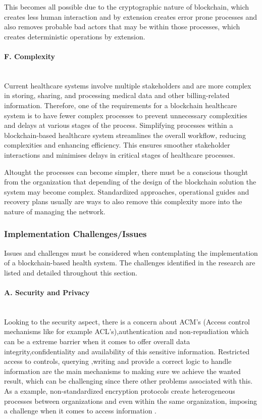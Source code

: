 This becomes all possible due to the cryptographic nature of blockchain, which creates less human interaction and by extension creates error prone processes and also removes probable bad actors that may be within those processes, which creates deterministic operations by extension.
\paragraph{F. Complexity} \mbox{}\\
Current healthcare systems involve multiple stakeholders and are more complex in storing, sharing, and processing medical data and other billing-related information. Therefore, one of the requirements for a blockchain healthcare system is to have fewer complex processes to prevent unnecessary complexities and delays at various stages of the process.
Simplifying processes within a blockchain-based healthcare system streamlines the overall workflow, reducing complexities and enhancing efficiency. This ensures smoother stakeholder interactions and minimises delays in critical stages of healthcare processes.

Altought the processes can become simpler, there must be a conscious thought from the organization that depending of the design of the blockchain solution the system may become complex. Standardized approaches, operational guides and recovery plans usually are ways to also remove this complexity more into the nature of managing the network.

\subsubsection{Implementation Challenges/Issues} 
Issues and challenges must be considered when contemplating the implementation of a blockchain-based health system. The challenges identified in the research are listed and detailed throughout this section.

\paragraph{A. Security and Privacy} \mbox{}\\
Looking to the security aspect, there is a concern about ACM's (Access control mechanisms like for example ACL's),authentication and non-repudiation which can be a extreme barrier when it comes to offer overall data integrity,confidentiality and availability of this sensitive information. Restricted access to controls, querying ,writing and provide a correct logic to handle information are the main mechanisms to making sure we achieve the wanted result, which can be challenging since there other problems associated with this. As a example, non-standardized encryption protocols create heterogeneous processes between organizations and even within the same organization, imposing a challenge when it comes to access information \cite{med-rec}.

